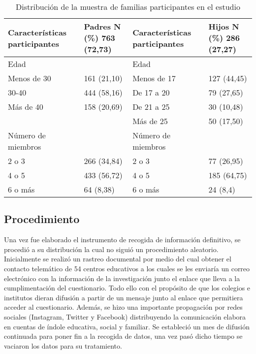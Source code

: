 \documentclass{textolivre}
\begin{document}
\begin{table}[htpb]
\caption{Distribución de la muestra de familias participantes en el estudio}
\label{tab1}
\centering
\begin{tabular}{p{}p{}p{}p{}}
\toprule 
Características participantes & Padres N (\%) 763 (72,73)	& Características participantes	& Hijos N (\%) 286 (27,27)
\\
\midrule
Edad & & Edad &
\\ 
\midrule
Menos de 30	& 161 (21,10) & Menos de 17 & 127 (44,45)
\\
30-40 & 444 (58,16) & De 17 a 20 & 79 (27,65)
\\
Más de 40 & 158 (20,69) & De 21 a 25 & 30 (10,48)
\\
& & Más de 25 & 50 (17,50)
\\
\midrule
Número de miembros & & Número de miembros &
\\
\midrule
2 o 3 & 266 (34,84)	& 2 o 3 & 77 (26,95)
\\
4 o 5 & 433 (56,72)	& 4 o 5 & 185 (64,75)
\\
6 o más	& 64 (8,38)	& 6 o más & 24 (8,4)
\\
\bottomrule
\end{tabular}
\centering
{}
\end{table}

\subsection{Procedimiento}
Una vez fue elaborado el instrumento de recogida de información definitivo, se procedió a su distribución la cual no siguió un procedimiento aleatorio. Inicialmente se realizó un rastreo documental por medio del cual obtener el contacto telemático de 54 centros educativos a los cuales se les enviaría un correo electrónico con la información de la investigación junto el enlace que lleva a la cumplimentación del cuestionario. Todo ello con el propósito de que los colegios e institutos dieran difusión a partir de un mensaje junto al enlace que permitiera acceder al cuestionario. Además, se hizo una importante propagación por redes sociales (Instagram, Twitter y Facebook) distribuyendo la comunicación elabora en cuentas de índole educativa, social y familiar. Se estableció un mes de difusión continuada para poner fin a la recogida de datos, una vez pasó dicho tiempo se vaciaron los datos para su tratamiento.  
\end{document}
